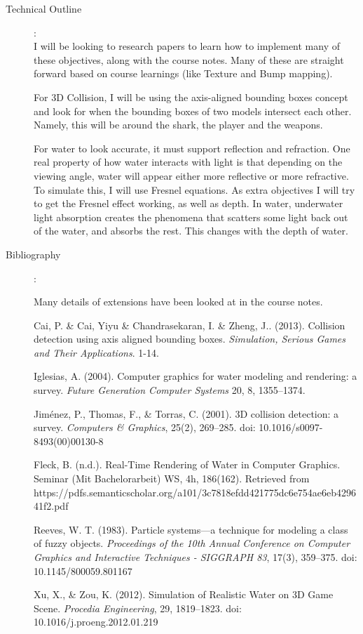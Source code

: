 \documentclass {article}
\begin{document}
\begin{description}
\item[Technical Outline]:\\
     I will be looking to research papers to learn how to implement many of these 
     objectives, along with the course notes. Many of these are straight forward based on 
     course learnings (like Texture and Bump mapping). 

     For 3D Collision, I will be using the axis-aligned bounding boxes concept and look for 
     when the bounding boxes of two models intersect each other. Namely, this will be around 
     the shark, the player and the weapons.

     For water to look accurate, it must support reflection and refraction. One real property 
     of how water interacts with light is that depending on the viewing angle, water will 
     appear either more reflective or more refractive. To simulate this, I will use Fresnel equations. 
     As extra objectives I will try to get the Fresnel effect working, as well as depth. In water, underwater 
     light absorption creates the phenomena that scatters some light back out of the water, and absorbs the rest. 
     This changes with the depth of water. 

\item[Bibliography]:

Many details of extensions have been looked at in the course notes.

Cai, P. \& Cai, Yiyu \& Chandrasekaran, I. \& Zheng, J.. (2013). Collision detection 
     using axis aligned bounding boxes. \textit{Simulation, Serious Games and Their Applications}. 1-14.

Iglesias, A. (2004). Computer graphics for water modeling
     and rendering: a survey. \textit{Future Generation Computer Systems}
     20, 8, 1355–1374.

Jiménez, P., Thomas, F., \& Torras, C. (2001). 3D collision detection: a survey. \textit{Computers \& Graphics}, 
     25(2), 269–285. doi: 10.1016/s0097-8493(00)00130-8

Fleck, B. (n.d.). Real-Time Rendering of Water in Computer Graphics. Seminar (Mit Bachelorarbeit) WS, 4h, 
     186(162). Retrieved from \\ 
     https://pdfs.semanticscholar.org/a101/3c7818efdd421775dc6e754ae6eb429641f2.pdf

Reeves, W. T. (1983). Particle systems---a technique for modeling a class of fuzzy 
     objects. \textit{Proceedings of the 10th Annual Conference on Computer Graphics and 
     Interactive Techniques - SIGGRAPH 83}, 17(3), 359–375. doi: 10.1145/800059.801167

Xu, X., \& Zou, K. (2012). Simulation of Realistic Water on 3D Game Scene. 
     \textit{Procedia Engineering}, 29, 1819–1823. doi: 10.1016/j.proeng.2012.01.219

\end{description}
\newpage
\end{document}
